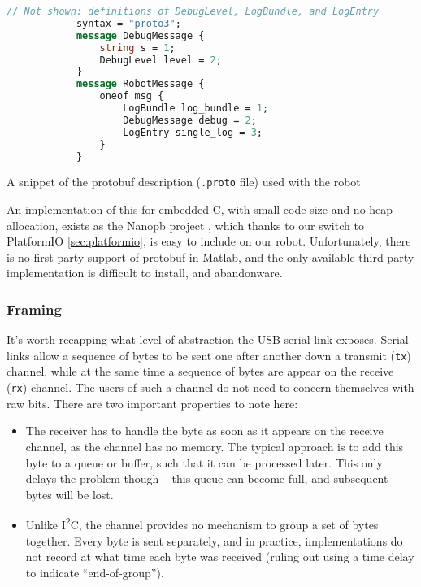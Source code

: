 \documentclass[main.tex]{subfiles}
\begin{document}
		\begin{listingfloat}
			\begin{lstlisting}[language=proto, gobble=6, frame=single]
			// Not shown: definitions of DebugLevel, LogBundle, and LogEntry
			syntax = "proto3";
			message DebugMessage {
				string s = 1;
				DebugLevel level = 2;
			}
			message RobotMessage {
				oneof msg {
					LogBundle log_bundle = 1;
					DebugMessage debug = 2;
					LogEntry single_log = 3;
				}
			}
			\end{lstlisting}
			\caption{A snippet of the protobuf description (\texttt{.proto} file) used with the robot}
			\label{lst:proto}
		\end{listingfloat}

		An implementation of this for embedded C, with small code size and no heap allocation, exists as the Nanopb project \cite{nanopb}, which thanks to our switch to PlatformIO \cref{sec:platformio}, is easy to include on our robot.
		Unfortunately, there is no first-party support of protobuf in Matlab, and the only available third-party implementation \cite{protobuf-matlab} is difficult to install, and abandonware.\footnotemark


	\subsubsection{Framing}

		It's worth recapping what level of abstraction the USB serial link exposes.
		Serial links allow a sequence of bytes to be sent one after another down a transmit (\texttt{tx}) channel, while at the same time a sequence of bytes are appear on the receive (\texttt{rx}) channel. The users of such a channel do not need to concern themselves with raw bits. There are two important properties to note here:
		\begin{itemize}[noitemsep]
			\item
				The receiver has to handle the byte as soon as it appears on the receive channel, as the channel has no memory.
				The typical approach is to add this byte to a queue or buffer, such that it can be processed later.
				This only delays the problem though -- this queue can become full, and subsequent bytes will be lost.
			\item
				Unlike I\textsuperscript{2}C, the channel provides no mechanism to group a set of bytes together.
				Every byte is sent separately, and in practice, implementations do not record at what time each byte was received (ruling out using a time delay to indicate \enquote{end-of-group}).
		\end{itemize}
\end{document}

